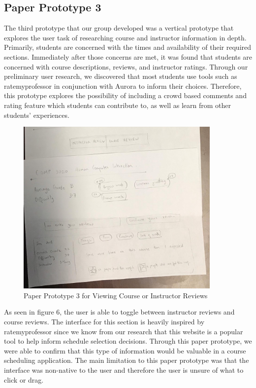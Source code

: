 \documentclass{article}
\begin{document}
\subsection{Paper Prototype 3}
The third prototype that our group developed was a vertical prototype that explores the user task of researching course and instructor information in depth. Primarily, students are concerned with the times and availability of their required sections. Immediately after those concerns are met, it was found that students are concerned with course descriptions, reviews, and instructor ratings. Through our preliminary user research, we discovered that most students use tools such as ratemyprofessor in conjunction with Aurora to inform their choices. Therefore, this prototype explores the possibility of including a crowd based comments and rating feature which students can contribute to, as well as learn from other students' experiences.
\begin{figure}[h]
	    \centering
	    \caption{Paper Prototype 3 for Viewing Course or Instructor Reviews}
	    \includegraphics[width=10cm]{ViewCourseInfo_Prototype/paper3-1.jpeg}
\end{figure}
\newline
\newline
\noindent
\noindent
As seen in figure 6, the user is able to toggle between instructor reviews and course reviews. The interface for this section is heavily inspired by ratemyprofessor since we know from our research that this website is a popular tool to help inform schedule selection decisions. Through this paper prototype, we were able to confirm that this type of information would be valuable in a course scheduling application. 
\newline
\noindnet
The main limitation to this paper prototype was that the interface was non-native to the user and therefore the user is unsure of what to click or drag. 
\end{document}
